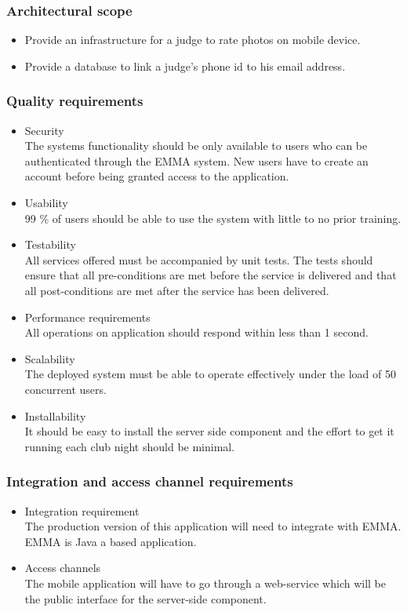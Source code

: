 \documentclass[10pt,a4paper]{article}
\begin{document}
\subsubsection{Architectural scope}
\begin{itemize}
\item Provide an infrastructure for a judge to rate photos on mobile device.
\item Provide a database to link a judge's phone id to his email address.
\end{itemize}
\subsubsection{Quality requirements}
\begin{itemize}
\item Security \\
The systems functionality should be only available to users who can be authenticated through the EMMA system. New users have to create an account before being granted access to the application.
\item Usability \\
99 \% of users should be able to use the system with little to no prior training.
\item Testability \\
All services offered must be accompanied by unit tests. The tests should ensure that all pre-conditions are met before the service is delivered and that all post-conditions are met after the service has been delivered.
\item Performance requirements \\
 All operations on application should respond within less than 1 second.
\item Scalability \\
The deployed system must be able to operate effectively under the load of 50 concurrent users.
\item Installability \\
It should be easy to install the server side component and the effort to get it running each club night should be minimal.
\end{itemize}
\subsubsection{Integration and access channel requirements}
\begin{itemize}
\item Integration requirement \\
The production version of this application will need to integrate with EMMA. EMMA is Java a based application.
\item Access channels \\
The mobile application will have to go through a web-service which will be the public interface for the server-side component. 
\end{itemize}
\end{document}
